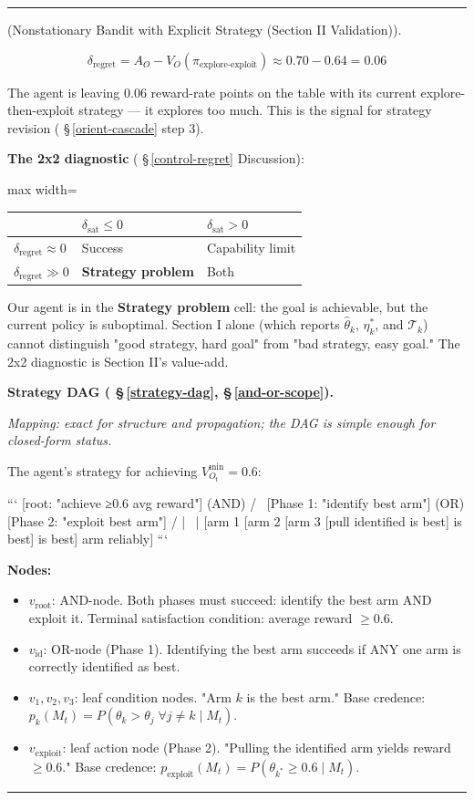 \documentclass[11pt,oneside]{article}
\newcounter{claim}[section]
\renewcommand{\theclaim}{\thesection.\arabic{claim}}
\newenvironment{segment}[2]{%
  \refstepcounter{claim}%
  \bigskip\noindent\hrule\smallskip
  \noindent{\bfseries #1~\theclaim}\enskip(#2).\par\smallskip
  \noindent\ignorespaces
}{%
  \par\smallskip\noindent\hrule\bigskip
}
\newenvironment{remark}[1][]{\begin{segment}{Remark}{#1}}{\end{segment}}
\begin{document}
\begin{remark}[Nonstationary Bandit with Explicit Strategy (Section II Validation)]
$$\delta_\text{regret} = A_O - V_O(\pi_\text{explore-exploit}) \approx 0.70 - 0.64 = 0.06$$

The agent is leaving $0.06$ reward-rate points on the table with its current explore-then-exploit strategy — it explores too much. This is the signal for strategy revision ( \S\,\ref{orient-cascade} step 3).

\textbf{The 2x2 diagnostic} ( \S\,\ref{control-regret} Discussion):

\begin{adjustbox}{max width=\textwidth}
\small
\begin{tabular}{lll}
\toprule
 & $\delta_\text{sat} \leq 0$ & $\delta_\text{sat} > 0$ \\
\midrule
$\delta_\text{regret} \approx 0$ & Success & Capability limit \\
$\delta_\text{regret} \gg 0$ & \textbf{Strategy problem} & Both \\
\bottomrule
\end{tabular}
\end{adjustbox}


Our agent is in the \textbf{Strategy problem} cell: the goal is achievable, but the current policy is suboptimal. Section I alone (which reports $\hat\theta_k$, $\eta^*_k$, and $\mathcal T_k$) cannot distinguish "good strategy, hard goal" from "bad strategy, easy goal." The 2x2 diagnostic is Section II's value-add.


\medskip\noindent\textbf{Strategy DAG ( \S\,\ref{strategy-dag}, \S\,\ref{and-or-scope}).}


\textit{Mapping: exact for structure and propagation; the DAG is simple enough for closed-form status.}

The agent's strategy for achieving $V_{O_t}^{\min} = 0.6$:

```
[root: "achieve ≥0.6 avg reward"] (AND)
/                    \
[Phase 1: "identify best arm"] (OR)    [Phase 2: "exploit best arm"]
/         |         \                      |
[arm 1       [arm 2       [arm 3         [pull identified
is best]     is best]     is best]        arm reliably]
```

\textbf{Nodes:}
\begin{itemize}
  \item $v_\text{root}$: AND-node. Both phases must succeed: identify the best arm AND exploit it. Terminal satisfaction condition: average reward $\geq 0.6$.
  \item $v_\text{id}$: OR-node (Phase 1). Identifying the best arm succeeds if ANY one arm is correctly identified as best.
  \item $v_1, v_2, v_3$: leaf condition nodes. "Arm $k$ is the best arm." Base credence: $p_k(M_t) = P(\theta_k > \theta_j \;\forall j \neq k \mid M_t)$.
  \item $v_\text{exploit}$: leaf action node (Phase 2). "Pulling the identified arm yields reward $\geq 0.6$." Base credence: $p_\text{exploit}(M_t) = P(\theta_{k^*} \geq 0.6 \mid M_t)$.
\end{itemize}



\end{remark}
\end{document}
